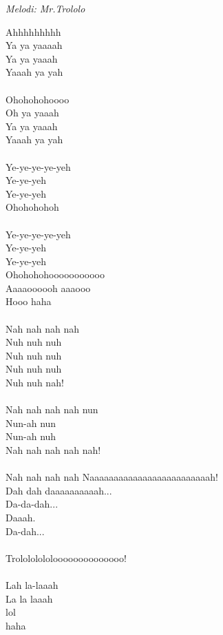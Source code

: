 {\footnotesize\textit{Melodi: Mr.Trololo}}\par
\vspace{10pt}
Ahhhhhhhhh\\
Ya ya yaaaah\\
Ya ya yaaah\\
Yaaah ya yah\\
\\
Ohohohohoooo\\
Oh ya yaaah\\
Ya ya yaaah\\
Yaaah ya yah\\
\\
Ye-ye-ye-ye-yeh\\
Ye-ye-yeh\\
Ye-ye-yeh\\
Ohohohohoh\\
\\
Ye-ye-ye-ye-yeh\\
Ye-ye-yeh\\
Ye-ye-yeh\\
Ohohohohooooooooooo\\
Aaaaoooooh aaaooo\\
Hooo haha\\
\\
Nah nah nah nah\\
Nuh nuh nuh\\
Nuh nuh nuh\\
Nuh nuh nuh\\
Nuh nuh nah!\\
\\
Nah nah nah nah nun\\
Nun-ah nun\\
Nun-ah nuh\\
Nah nah nah nah nah!\\
\\
Nah nah nah nah Naaaaaaaaaaaaaaaaaaaaaaaaah!\\
Dah dah daaaaaaaaaah...\\
Da-da-dah...\\
Daaah.\\
Da-dah...\\
\\
Trolololololoooooooooooooo!\\
\\
Lah la-laaah\\
La la laaah\\
lol\\
haha\\
\\
